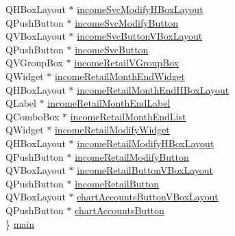 \begin{CompactItemize}
\begin{tabbing}
\>QHBoxLayout $\ast$ \hyperlink{classReportStack_r63}{incomeSvcModifyHBoxLayout}\\
\>QPushButton $\ast$ \hyperlink{classReportStack_r64}{incomeSvcModifyButton}\\
\>QVBoxLayout $\ast$ \hyperlink{classReportStack_r65}{incomeSvcButtonVBoxLayout}\\
\>QPushButton $\ast$ \hyperlink{classReportStack_r66}{incomeSvcButton}\\
\>QVGroupBox $\ast$ \hyperlink{classReportStack_r67}{incomeRetailVGroupBox}\\
\>QWidget $\ast$ \hyperlink{classReportStack_r68}{incomeRetailMonthEndWidget}\\
\>QHBoxLayout $\ast$ \hyperlink{classReportStack_r69}{incomeRetailMonthEndHBoxLayout}\\
\>QLabel $\ast$ \hyperlink{classReportStack_r70}{incomeRetailMonthEndLabel}\\
\>QComboBox $\ast$ \hyperlink{classReportStack_r71}{incomeRetailMonthEndList}\\
\>QWidget $\ast$ \hyperlink{classReportStack_r72}{incomeRetailModifyWidget}\\
\>QHBoxLayout $\ast$ \hyperlink{classReportStack_r73}{incomeRetailModifyHBoxLayout}\\
\>QPushButton $\ast$ \hyperlink{classReportStack_r74}{incomeRetailModifyButton}\\
\>QVBoxLayout $\ast$ \hyperlink{classReportStack_r75}{incomeRetailButtonVBoxLayout}\\
\>QPushButton $\ast$ \hyperlink{classReportStack_r76}{incomeRetailButton}\\
\>QVBoxLayout $\ast$ \hyperlink{classReportStack_r77}{chartAccountsButtonVBoxLayout}\\
\>QPushButton $\ast$ \hyperlink{classReportStack_r78}{chartAccountsButton}\\
\} \hyperlink{classReportStack_r79}{main}\\


\end{tabbing}
\end{CompactItemize}
